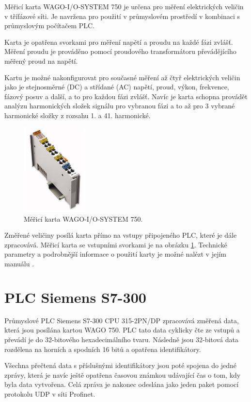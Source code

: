 Měřicí karta WAGO-I/O-SYSTEM 750 \cite{wago} je určena pro měření elektrických veličin v třífázové síti. Je navržena pro použití v průmyslovém prostředí v kombinaci s průmyslovým počítačem PLC. 

Karta je opatřena svorkami pro měření napětí a proudu na každé fázi zvlášť. Měření proudu je prováděno pomocí proudového transformátoru převádějícího měřený proud na napětí. 

Kartu je možné nakonfigurovat pro současné měření až čtyř elektrických veličin jako je stejnosměrné (DC) a střídané (AC) napětí, proud, výkon, frekvence, fázový posuv a další, a to pro každou fázi zvlášť. Navíc je karta schopna provádět analýzu harmonických složek signálu pro vybranou fázi a to až pro 3 vybrané harmonické složky z rozsahu 1. a 41. harmonické. 

\begin{figure}[ht]
    \includegraphics[width=0.3\textwidth]{wago_obr}
    \caption{Měřicí karta WAGO-I/O-SYSTEM 750.}
    \label{wago_pic}
\end{figure}

Změřené veličiny posílá karta přímo na vstupy připojeného PLC, které je dále zpracovává. Měřicí karta se vstupními svorkami je na obrázku \ref{wago_pic}. Technické parametry a podrobnější informace o použití karty je možné nalézt v jejím manuálu \cite{wago}.

\section{PLC Siemens S7-300}

Průmyslové PLC Siemens S7-300 CPU 315-2PN/DP \cite{siemens_plc} zpracovává změřená data, která jsou posílána kartou WAGO 750. PLC tato data cyklicky čte ze vstupů a převádí je do 32-bitového hexadecimálního tvaru. Následně jsou 32-bitová data rozdělena na horních a spodních 16 bitů a opatřena identifikátory. 

Všechna přečtená data s příslušnými identifikátory jsou poté spojena do jedné zprávy, která je navíc ještě opatřena časovou známkou udávající čas o tom, kdy byla data vytvořena. Celá zpráva je nakonec odeslána jako jeden paket pomocí protokolu UDP v síti Profinet.  

